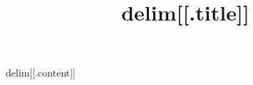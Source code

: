 \documentclass{article}
\title{delim[[.title]]}
\begin{document}
\maketitle
delim[[.content]]
\end{document}

